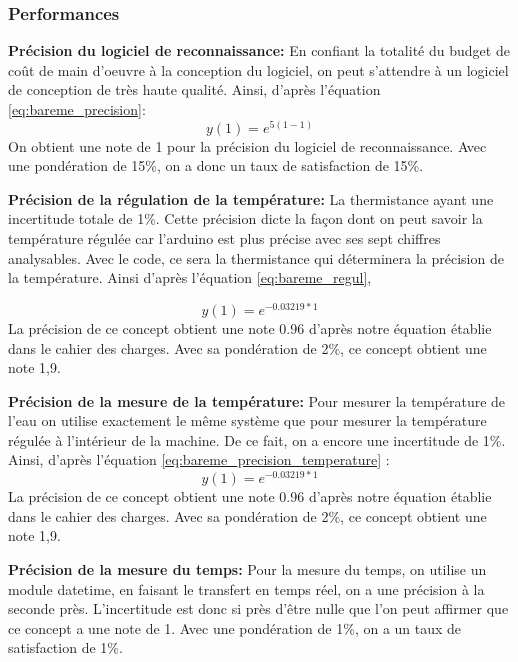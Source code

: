 \subsubsection{Performances}

\textbf{Précision du logiciel de reconnaissance:}
En confiant la totalité du budget de coût de main d'oeuvre à la conception du logiciel, on peut s'attendre à un logiciel de conception de très haute qualité. Ainsi, d'après l'équation \ref{eq:bareme_precision}:
\begin{equation}
    y(1) = e^{5(1-1)}
\end{equation}
On obtient une note de 1 pour la précision du logiciel de reconnaissance. Avec une pondération de 15\%, on a donc un taux de satisfaction de 15\%.
\vspace{5mm}


\textbf{Précision de la régulation de la température:}
La thermistance ayant une incertitude totale de 1\%. Cette précision dicte la façon dont on peut savoir la température régulée car l'arduino est plus précise avec ses sept chiffres analysables. Avec le code, ce sera la thermistance qui déterminera la précision de la température. Ainsi d'après l'équation \ref{eq:bareme_regul}, 

\begin{equation}
    y(1) = e^{-0.03219*1}
\end{equation}
La précision de ce concept obtient une note 0.96 d'après notre équation établie dans le cahier des charges. Avec sa pondération de 2\%, ce concept obtient une note 1,9.
\vspace{5mm}


\textbf{Précision de la mesure de la température:}
Pour mesurer la température de l'eau on utilise exactement le même système que pour mesurer la température régulée à l'intérieur de la machine. De ce fait, on a encore une incertitude de 1\%. Ainsi, d'après l'équation \ref{eq:bareme_precision_temperature} :
\begin{equation}
    y(1) = e^{-0.03219*1}
\end{equation}
La précision de ce concept obtient une note 0.96 d'après notre équation établie dans le cahier des charges. Avec sa pondération de 2\%, ce concept obtient une note 1,9.
\vspace{5mm}


\textbf{Précision de la mesure du temps:}
Pour la mesure du temps, on utilise un module datetime, en faisant le transfert en temps réel, on a une précision à la seconde près. L'incertitude est donc si près d'être nulle que l'on peut affirmer que ce concept a une note de 1. Avec une pondération de 1\%, on a un taux de satisfaction de 1\%. 
\vspace{5mm}



